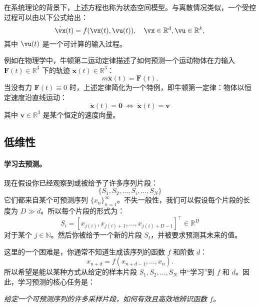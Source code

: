 \documentclass[../../book-main_zh.tex]{subfiles}
\begin{document}
在系统理论的背景下\cite{Cal:Des,Sastry-Nonlinear}，上述方程也称为状态空间模型。与离散情况类似，一个受控过程可以由以下公式给出：
\begin{equation}
    \dot{\vx}(t) = f(\vx(t), \vu(t) ), \quad \vx \in \mathbb{R}^d, \vu \in \mathbb{R}^k,
    \label{eqn:process-controlled}
\end{equation}
其中 $\vu(t)$ 是一个可计算的输入过程。

\begin{example}
    例如在物理学中，牛顿第二运动定律描述了如何预测一个运动物体在力输入 $\boldsymbol{F}(t) \in \mathbb{R}^3$ 下的轨迹 $\boldsymbol{x}(t) \in \mathbb{R}^3$：
\begin{equation}
    m\ddot{\boldsymbol{x}}(t) = \boldsymbol{F}(t).
\end{equation}
当没有力 $\boldsymbol{F}(t) \equiv 0$ 时，上述定律简化为一个特例，即牛顿第一定律：物体以恒定速度沿直线运动：
\begin{equation}
   \ddot{\boldsymbol{x}}(t) = \boldsymbol{0} \; \Leftrightarrow \; \dot{\boldsymbol{x}}(t) = \boldsymbol{v}
\end{equation}
其中 $\boldsymbol{v} \in \mathbb{R}^3$ 是某个恒定的速度向量。
\end{example}




\subsection{低维性}\label{sec:intro-low-dimensionality}
\paragraph{学习去预测。}
现在假设你已经观察到或被给予了许多序列片段：
\begin{equation}
    \{S_1, S_2, \ldots, S_i, \ldots, S_N\}
\end{equation}
它们都来自某个可预测序列 $\{x_n\}_{n=1}^\infty$。不失一般性，我们可以假设每个片段的长度为 $D \gg d$。所以每个片段的形式为：
\begin{equation}
    S_i = [x_{j(i)}, x_{j(i)+1}, \ldots, x_{j(i)+D-1}]^\top \in \mathbb{R}^D
\end{equation}
对于某个 $j \in \mathbb{N}$。然后你被给予一个新的片段 $S_t$，并被要求预测其未来的值。

这里的一个困难是，你通常不知道生成该序列的函数 $f$ 和阶数 $d$：
\begin{equation}
    x_{n+d} = f(x_{n+d-1}, \ldots,  x_{n}).
\label{eqn:sequence-order-d}
\end{equation}
所以希望是能以某种方式从给定的样本片段 $S_1, S_2, \ldots, S_N$ 中“学习”到 $f$ 和 $d$。因此，学习预测的核心任务是：
\begin{center}
{\em 给定一个可预测序列的许多采样片段，如何有效且高效地辨识函数 $f$。}
\end{center}
\end{document}

